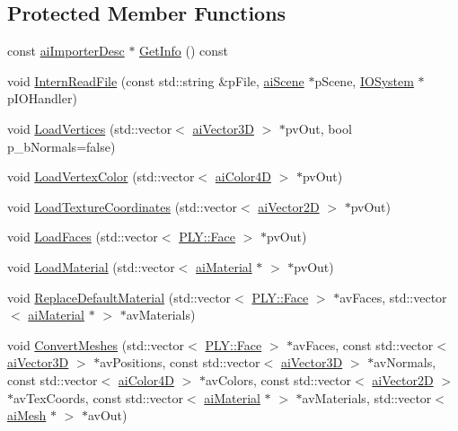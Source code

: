 \subsection*{Protected Member Functions}
\begin{DoxyCompactItemize}
\item 
const \hyperlink{structai_importer_desc}{ai\+Importer\+Desc} $\ast$ \hyperlink{class_assimp_1_1_p_l_y_importer_afc947a0806c89d5b1bd89baca0cd7aa7}{Get\+Info} () const 
\item 
void \hyperlink{class_assimp_1_1_p_l_y_importer_a8849cd4413bdc1a9d70c5c539328b2b3}{Intern\+Read\+File} (const std\+::string \&p\+File, \hyperlink{structai_scene}{ai\+Scene} $\ast$p\+Scene, \hyperlink{class_assimp_1_1_i_o_system}{I\+O\+System} $\ast$p\+I\+O\+Handler)
\item 
void \hyperlink{class_assimp_1_1_p_l_y_importer_a9fb841656949c99a73862b54a619b4a8}{Load\+Vertices} (std\+::vector$<$ \hyperlink{structai_vector3_d}{ai\+Vector3\+D} $>$ $\ast$pv\+Out, bool p\+\_\+b\+Normals=false)
\item 
void \hyperlink{class_assimp_1_1_p_l_y_importer_a8e59d3bef6dc1b0483e83f6baedc6afb}{Load\+Vertex\+Color} (std\+::vector$<$ \hyperlink{structai_color4_d}{ai\+Color4\+D} $>$ $\ast$pv\+Out)
\item 
void \hyperlink{class_assimp_1_1_p_l_y_importer_a8389ab904cdf94491560b7c9c1b17e70}{Load\+Texture\+Coordinates} (std\+::vector$<$ \hyperlink{structai_vector2_d}{ai\+Vector2\+D} $>$ $\ast$pv\+Out)
\item 
void \hyperlink{class_assimp_1_1_p_l_y_importer_a7e7afe11dbe2b85d96c73ae85d3ac9fe}{Load\+Faces} (std\+::vector$<$ \hyperlink{class_assimp_1_1_p_l_y_1_1_face}{P\+L\+Y\+::\+Face} $>$ $\ast$pv\+Out)
\item 
void \hyperlink{class_assimp_1_1_p_l_y_importer_ab94732472c0dec9fe426389a54da41fb}{Load\+Material} (std\+::vector$<$ \hyperlink{classai_material}{ai\+Material} $\ast$ $>$ $\ast$pv\+Out)
\item 
void \hyperlink{class_assimp_1_1_p_l_y_importer_a5b6121a39114adaacf37b7e66098960c}{Replace\+Default\+Material} (std\+::vector$<$ \hyperlink{class_assimp_1_1_p_l_y_1_1_face}{P\+L\+Y\+::\+Face} $>$ $\ast$av\+Faces, std\+::vector$<$ \hyperlink{classai_material}{ai\+Material} $\ast$ $>$ $\ast$av\+Materials)
\item 
void \hyperlink{class_assimp_1_1_p_l_y_importer_a25c9670488f2328a04ef2c86ea327878}{Convert\+Meshes} (std\+::vector$<$ \hyperlink{class_assimp_1_1_p_l_y_1_1_face}{P\+L\+Y\+::\+Face} $>$ $\ast$av\+Faces, const std\+::vector$<$ \hyperlink{structai_vector3_d}{ai\+Vector3\+D} $>$ $\ast$av\+Positions, const std\+::vector$<$ \hyperlink{structai_vector3_d}{ai\+Vector3\+D} $>$ $\ast$av\+Normals, const std\+::vector$<$ \hyperlink{structai_color4_d}{ai\+Color4\+D} $>$ $\ast$av\+Colors, const std\+::vector$<$ \hyperlink{structai_vector2_d}{ai\+Vector2\+D} $>$ $\ast$av\+Tex\+Coords, const std\+::vector$<$ \hyperlink{classai_material}{ai\+Material} $\ast$ $>$ $\ast$av\+Materials, std\+::vector$<$ \hyperlink{structai_mesh}{ai\+Mesh} $\ast$ $>$ $\ast$av\+Out)
\end{DoxyCompactItemize}
